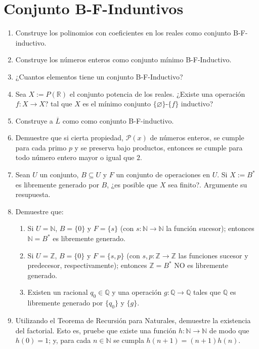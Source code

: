 \documentclass[letterpaper,DIV=15,headsepline,12pt]{scrartcl}
\newcommand{\mathds}[1]{\mathbb{#1}}
\renewcommand{\emptyset}{\varnothing}
\begin{document}
    \newpage
    \section*{Conjunto B-F-Induntivos}
        \begin{enumerate}
            \item Construye los polinomios con coeficientes en los reales como conjunto B-F-inductivo.
            \item Construye los números enteros como conjunto mínimo B-F-Inductivo.
            \item ¿Cuantos elementos tiene un conjunto B-F-Inductivo?
            \item Sea $X:=P(\mathds{R})$ el conjunto potencia de los reales. ¿Existe una operación $f:X \to X$? tal que $X$ es el mínimo conjunto $\{\emptyset\}$-$\{f\}$ inductivo?
            \item Construye a $\overline{L}$ como como conjunto B-F-inductivo.
            \item Demuestre que si cierta propiedad, $\mathcal{P}(x)$ de números enteros, se cumple para cada primo $p$ y se preserva bajo productos, entonces se cumple para todo número entero mayor o igual que $2$.
            \item Sean $U$ un conjunto, $B \subseteq U$ y $F$ un conjunto de operaciones en $U$. Si $X:=B^*$ es libremente generado por $B$, ¿es posible que $X$ sea finito?. Argumente su resupuesta.
            \item Demuestre que:
            \begin{enumerate}
                \item Si $U=\mathds{N}$, $B=\{0\}$ y $F=\{s\}$ (con $s:\mathds{N} \to \mathds{N}$ la función sucesor); entonces $\mathds{N}=B^*$ es libremente generado.
                \item Si $U=\mathds{Z}$, $B=\{0\}$ y $F=\{s,p\}$ (con $s,p:\mathds{Z} \to \mathds{Z}$ las funciones sucesor y predecesor, respectivamente); entonces $\mathds{Z}=B^*$ NO es libremente generado.
                \item Existen un racional $q_0 \in \mathds{Q}$ y una operación $g:\mathds{Q} \to \mathds{Q}$ tales que $\mathds{Q}$ es libremente generado por $\{q_0\}$ y $\{g\}$.
            \end{enumerate}
            \item Utilizando el Teorema de Recursión para Naturales, demuestre la existencia del factorial. Esto es, pruebe que existe una función $h:\mathds{N} \to \mathds{N}$ de modo que $h(0)=1$; y, para cada $n \in \mathds{N}$ se cumpla $h(n+1)=(n+1)h(n)$.
        \end{enumerate}
    
\end{document}

